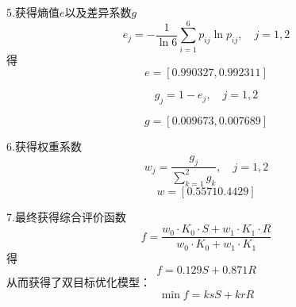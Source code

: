 \documentclass[../main.tex]{subfiles}
\begin{document}
5.获得熵值\(e\)以及差异系数\(g\)
\begin{equation}
e_{j} = - \frac{1}{ \ln 6} \sum_{i=1} ^{6} p_{ij} \ln p_{ij}, \quad j = 1 ,2
\end{equation}
得
\[
e = [0.990327, 0.992311]
\]

\begin{equation}
g _{j} = 1 - e_{j} , \quad j =  1, 2
\end{equation}

\[
g=[0.009673, 0.007689]
\]

6.获得权重系数
\begin{equation}
w_{j} = \frac{g_{j}}{\sum_{k=1}^{2} g _{k}} , \quad j = 1, 2
\end{equation}
\[
w=[0.5571   0.4429]
\]

7.最终获得综合评价函数
\[
f = \frac{w_0 \cdot K_0 \cdot S + w_1 \cdot K_1 \cdot R}{w_0 \cdot K_0 + w_1 \cdot K_1}
\]
得
\[
f=0.129 S+0.871 R
\]
从而获得了双目标优化模型：
\[
\min f = ks  S + kr  R
\]
\end{document}

